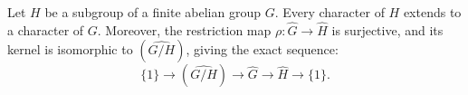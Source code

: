 Let $H$ be a subgroup of a finite abelian group $G$. Every character of $H$ extends to a character of $G$. Moreover, the restriction map $\rho: \hat{G} \to \hat{H}$ is surjective, and its kernel is isomorphic to $(\widehat{G/H})$, giving the exact sequence:
$$
\{1\} \to (\widehat{G/H}) \to \hat{G} \to \hat{H} \to \{1\}.
$$
